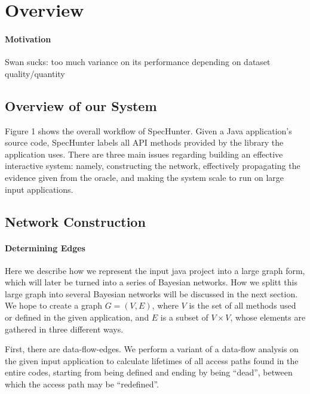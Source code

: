 \section{Overview}

\paragraph{Motivation}

Swan sucks: too much variance on its performance depending on dataset quality/quantity

\subsection{Overview of our System}


Figure 1 shows the overall workflow of SpecHunter. Given a Java application's
source code, SpecHunter labels all API methods provided by the library the application
uses. There are three main issues regarding building an effective interactive system:
namely, constructing the network, effectively propagating the evidence given from the
oracle, and making the system scale to run on large input applications.

\subsection{Network Construction}

\paragraph{Determining Edges}

Here we describe how we represent the input java project into a large graph form, which will
later be turned into a series of Bayesian networks. How we splitt this large
graph into several Bayesian networks will be discussed in the next section. %
We hope to create a graph $G=(V, E)$,
where $V$ is the set of all methods used or defined in the given application, and $E$ is a
subset of $V\times V$, whose elements are gathered in three different ways. 

First, there are data-flow-edges. We perform a variant of a data-flow analysis on the
given input application to calculate lifetimes of all access paths found in the
entire codes, starting from being defined and ending by being ``dead'', between
which the access path may be ``redefined''.

